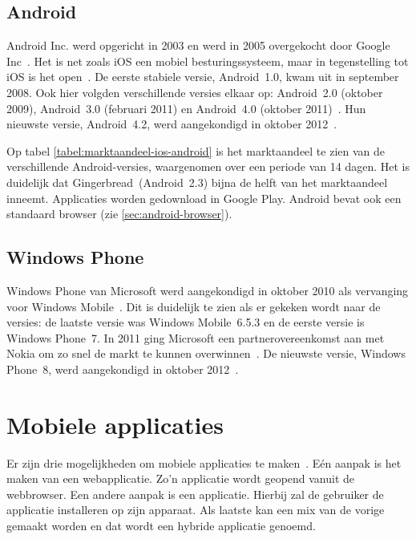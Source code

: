 \subsection{Android}
Android Inc. werd opgericht in 2003 en werd in 2005 overgekocht door Google Inc~\cite{Satyesh2012}. 
Het is net zoals iOS een mobiel besturingssysteem, maar in tegenstelling tot iOS is het open~\cite{David2011}. 
De eerste stabiele versie, Android~1.0, kwam uit in september 2008. 
Ook hier volgden verschillende versies elkaar op: Android~2.0 (oktober 2009), Android~3.0 (februari 2011) en Android~4.0 (oktober 2011)~\cite{Satyesh2012}. 
Hun nieuwste versie, Android~4.2, werd aangekondigd in oktober 2012~\cite{Sawers2012}. 

Op tabel \ref{tabel:marktaandeel-ios-android} is het marktaandeel te zien van de verschillende Android-versies, waargenomen over een periode van 14 dagen. 
Het is duidelijk dat Gingerbread~(Android~2.3) bijna de helft van het marktaandeel inneemt.
Applicaties worden gedownload in Google Play. 
Android bevat ook een standaard browser (zie \ref{sec:android-browser}).

\subsection{Windows Phone}
Windows Phone van Microsoft werd aangekondigd in oktober 2010 als vervanging voor Windows Mobile~\cite{Seitz2010,Lieberman2010}. 
Dit is duidelijk te zien als er gekeken wordt naar de versies: de laatste versie was Windows Mobile~6.5.3 en de eerste versie is Windows Phone~7. 
In 2011 ging Microsoft een partnerovereenkomst aan met Nokia om zo snel de markt te kunnen overwinnen~\cite{Microsoft2011}. 
De nieuwste versie, Windows Phone~8, werd aangekondigd in oktober 2012~\cite{Reed2012}. 


\section{Mobiele applicaties}
\label{sec:mobiele-applicaties}
Er zijn drie mogelijkheden om mobiele applicaties te maken~\cite{Accenture2012,Hales2012}. Eén aanpak is het maken van een webapplicatie.
Zo'n applicatie wordt geopend vanuit de webbrowser. 
Een andere aanpak is een  applicatie. Hierbij zal de gebruiker de applicatie installeren op zijn apparaat. 
Als laatste kan een mix van de vorige gemaakt worden en dat wordt een hybride applicatie genoemd.

